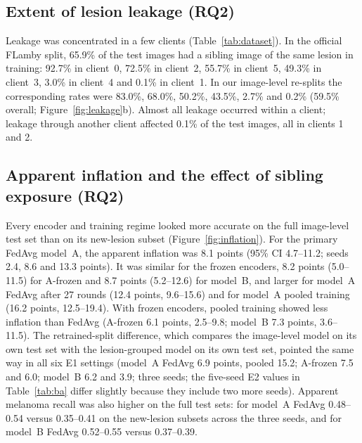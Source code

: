 \documentclass[VANCOUVER,Times1COL]{WileyNJDv5}
\begin{document}
\subsection{Extent of lesion leakage (RQ2)}
\label{sec:res-extent}

Leakage was concentrated in a few clients (Table~\ref{tab:dataset}). In the official FLamby split, 65.9\%
of the test images had a sibling image of the same lesion in training: 92.7\% in client~0, 72.5\% in
client~2, 55.7\% in client~5, 49.3\% in client~3, 3.0\% in client~4 and 0.1\% in client~1. In our
image-level re-splits the corresponding rates were 83.0\%, 68.0\%, 50.2\%, 43.5\%, 2.7\% and 0.2\%
(59.5\% overall; Figure~\ref{fig:leakage}b). Almost all leakage occurred within a client; leakage through
another client affected 0.1\% of the test images, all in clients 1 and 2.

\subsection{Apparent inflation and the effect of sibling exposure (RQ2)}
\label{sec:res-leakage}

Every encoder and training regime looked more accurate on the full image-level test set than on its
new-lesion subset (Figure~\ref{fig:inflation}). For the primary FedAvg model~A, the apparent inflation was
8.1 points (95\% CI 4.7--11.2; seeds 2.4, 8.6 and 13.3 points). It was similar for the frozen encoders,
8.2 points (5.0--11.5) for A-frozen and 8.7 points (5.2--12.6) for model~B, and larger for model~A FedAvg
after 27 rounds (12.4 points, 9.6--15.6) and for model~A pooled training (16.2 points, 12.5--19.4). With
frozen encoders, pooled training showed less inflation than FedAvg (A-frozen 6.1 points, 2.5--9.8;
model~B 7.3 points, 3.6--11.5). The retrained-split difference, which compares the image-level model on
its own test set with the lesion-grouped model on its own test set, pointed the same way in all six
E1 settings (model~A FedAvg 6.9 points, pooled 15.2; A-frozen 7.5 and 6.0; model~B 6.2 and 3.9; three
seeds; the five-seed E2 values in Table~\ref{tab:ba} differ slightly because they include two more
seeds). Apparent melanoma recall was also higher on the full test sets: for model~A FedAvg 0.48--0.54
versus 0.35--0.41 on the new-lesion subsets across the three seeds, and for model~B FedAvg 0.52--0.55
versus 0.37--0.39.
\end{document}
